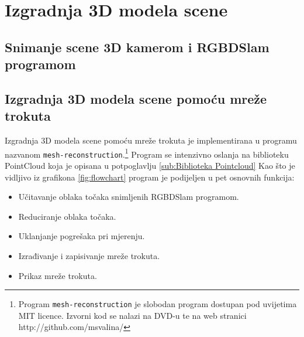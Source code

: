 \newpage

\section{Izgradnja 3D modela scene} %
\label{sec:Izgradnja 3D modela scene}

\subsection{Snimanje scene 3D kamerom i RGBDSlam programom} %
\label{sub:Snimanje scene 3D kamerom i RGBDSlam programom}


\subsection{Izgradnja 3D modela scene pomoću mreže trokuta} %
\label{sub:Izgradnja 3D modela scene pomoću mreže trokuta}

Izgradnja 3D modela scene pomoću mreže trokuta je implementirana u
programu nazvanom \texttt{mesh-reconstruction}.\footnote{
Program \texttt{mesh-reconstruction} je slobodan program dostupan pod
uvijetima MIT licence. Izvorni kod se nalazi na DVD-u te na web stranici
http://github.com/msvalina/}      
Program se intenzivno oslanja na biblioteku PointCloud koja je opisana u
potpoglavlju \ref{sub:Biblioteka Pointcloud} Kao što je vidljivo iz
grafikona \ref{fig:flowchart} program je podijeljen u pet osnovnih
funkcija:
\begin{itemize}
    \item Učitavanje oblaka točaka snimljenih RGBDSlam programom.
    \item Reduciranje oblaka točaka.
    \item Uklanjanje pogrešaka pri mjerenju.
    \item Izrađivanje i zapisivanje mreže trokuta.
    \item Prikaz mreže trokuta.
\end{itemize}

